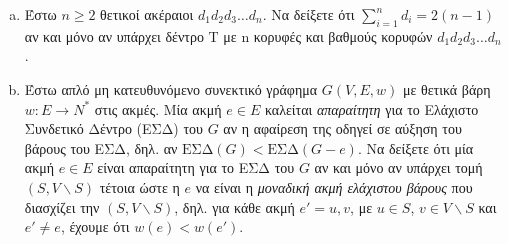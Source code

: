 \documentclass{assignment}
\begin{document}

\begin{enumerate}[(a)]

\item
Έστω $n \ge 2$ θετικοί ακέραιοι $d_1d_2d_3\dots d_n$. Να δείξετε ότι $\sum_{i=1}^{n} d_i = 2(n-1)$ αν και μόνο αν
υπάρχει δέντρο T με n κορυφές και βαθμούς κορυφών $d_1d_2d_3\dots d_n$.

\item
Έστω απλό μη κατευθυνόμενο συνεκτικό γράφημα $G(V, E, w)$ με θετικά βάρη $w : E \rightarrow N^{*} $ στις ακμές. Μία ακμή
$e \in E$ καλείται {\it απαραίτητη} για το Ελάχιστο Συνδετικό Δέντρο (ΕΣΔ) του $G$ αν η αφαίρεση της οδηγεί σε αύξηση
του βάρους του ΕΣΔ, δηλ. αν $\text{ΕΣΔ}(G) < \text{ΕΣΔ}(G-e)$. Να δείξετε ότι μία ακμή $e \in E$ είναι απαραίτητη για το ΕΣΔ του $G$ 
αν και μόνο αν υπάρχει τομή $(S, V \backslash S)$ τέτοια ώστε η $e$ να είναι η {\it μοναδική ακμή ελάχιστου βάρους} που διασχίζει 
την $(S, V \backslash S)$, δηλ. για κάθε ακμή $e' = {u, v}$, με $u \in S$, $v \in V \backslash S$ και $e' \neq e$, έχουμε ότι
$w(e) < w(e')$.

\end{enumerate}

\solution
\end{document}
